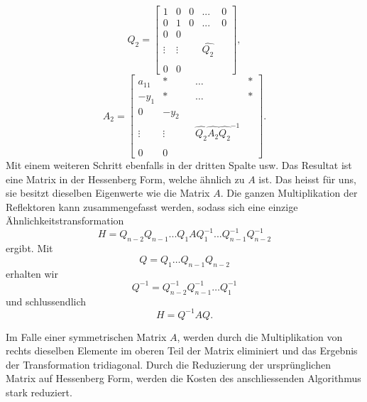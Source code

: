 \begin{equation}
	Q_{2}=
	\begin{bmatrix}
	1 & 0 & 0 & ... & 0\\
	0 & 1 & 0 & ... & 0\\
	0 & 0 &\\
	\vdots & \vdots & &\hat{Q_2} &\\
	 &  &\\
	0 & 0 &
	\end{bmatrix},
\end{equation}	
\begin{equation}
	A_{2}=
	\begin{bmatrix}
	a_{11} & * &  & \dots & *\\
	-y_{1} & * &  & \dots & *\\
	0 & -y_{2} &\\
	\vdots & \vdots  & &\hat{Q_2}\hat{A_{2}}\hat{Q_2}^{-1} &\\
	 &  &\\
	0 & 0 &
	\end{bmatrix}.
\end{equation}
Mit einem weiteren Schritt ebenfalls in der dritten Spalte usw.
Das Resultat ist eine Matrix in der Hessenberg Form, welche ähnlich zu $A$ ist.
Das heisst für uns, sie besitzt dieselben Eigenwerte wie die Matrix $A$.
Die ganzen Multiplikation der Reflektoren kann zusammengefasst werden, sodass sich eine einzige Ähnlichkeitstransformation
\begin{equation}
	H=Q_{n-2}Q_{n-1}...Q_{1}AQ_{1}^{-1}...Q_{n-1}^{-1}Q_{n-2}^{-1}
\end{equation}
ergibt.
Mit 
\begin{equation}
	Q=Q_{1}\dots Q_{n-1}Q_{n-2}
\end{equation}
erhalten wir
\begin{equation}
	Q^{-1} = Q_{n-2}^{-1}Q_{n-1}^{-1}\dots Q_{1}^{-1}
\end{equation}
und schlussendlich
\begin{equation}
H=Q^{-1}AQ.
\end{equation}

Im Falle einer symmetrischen Matrix $A$, werden durch die Multiplikation von rechts dieselben Elemente im oberen Teil der Matrix eliminiert und das Ergebnis der Transformation tridiagonal.
Durch die Reduzierung der ursprünglichen Matrix auf Hessenberg Form, werden die Kosten des anschliessenden Algorithmus stark reduziert.
